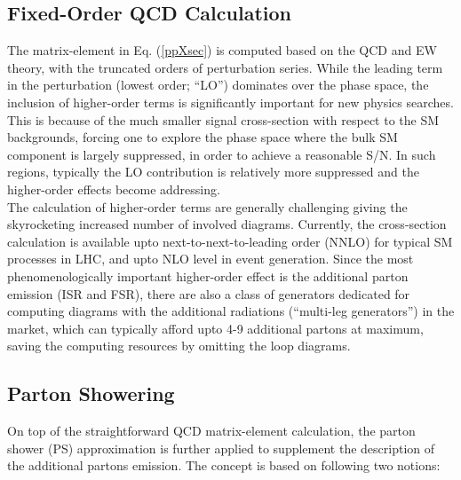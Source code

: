 \subsection{Fixed-Order QCD Calculation}
The matrix-element in Eq. (\ref{ppXsec}) is computed based on the QCD and EW theory, with the truncated orders of perturbation series.
While the leading term in the perturbation (lowest order; ``LO'') dominates over the phase space, 
the inclusion of higher-order terms is significantly important for new physics searches.
This is because of the much smaller signal cross-section with respect to the SM backgrounds,
forcing one to explore the phase space where the bulk SM component is largely suppressed, 
in order to achieve a reasonable S/N. 
In such regions, typically the LO contribution is relatively more suppressed 
and the higher-order effects become addressing. \\

The calculation of higher-order terms are generally challenging giving the skyrocketing increased number of involved diagrams.
Currently, the cross-section calculation is available upto next-to-next-to-leading order (NNLO) for typical SM processes in LHC, and upto NLO level in event generation. Since the most phenomenologically important higher-order effect is the additional parton emission (ISR and FSR), 
there are also a class of generators dedicated for computing diagrams with the additional radiations (``multi-leg generators'') in the market, which can typically afford upto 4-9 additional partons at maximum, saving the computing resources by omitting the loop diagrams. \\


\subsection{Parton Showering}
On top of the straightforward QCD matrix-element calculation,
the parton shower (PS) approximation is further applied to supplement the description of the additional partons emission.
The concept is based on following two notions:


